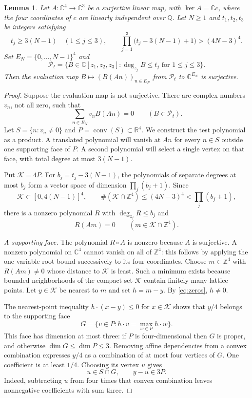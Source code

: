 \documentclass[11pt,a4paper]{amsart}
\newtheorem{lemma}[theorem]{Lemma}
\theoremstyle{remark}
\newcommand{\Q}{\mathbb Q}
\newcommand{\Z}{\mathbb Z}
\newcommand{\C}{\mathbb C}
\newcommand{\R}{\mathbb R}
\newcommand{\cP}{\mathcal P}
\newcommand{\cK}{\mathcal K}
\DeclareMathOperator{\conv}{conv}
\numberwithin{equation}{section}
\begin{document}
\begin{lemma}\label{lem:interpolation}
Let $A:\C^4\to\C^3$ be a surjective linear map, with $\ker A=\C c$, where the
four coordinates of $c$ are linearly independent over $\Q$.
Let $N\ge1$ and $t_1,t_2,t_3$ be integers satisfying
\begin{equation}\label{eq:budget}
 t_j\ge3(N-1)\quad(1\le j\le3),\qquad
 \prod_{j=1}^3\bigl(t_j-3(N-1)+1\bigr)>(4N-3)^4.
\end{equation}
Set $E_N=\{0,\ldots,N-1\}^4$ and
\[
 \cP_t=\{B\in\C[z_1,z_2,z_3]:\deg_{z_j}B\le t_j
                                      \text{ for }1\le j\le3\}.
\]
Then the evaluation map $B\mapsto(B(An))_{n\in E_N}$ from
$\cP_t$ to $\C^{E_N}$ is surjective.
\end{lemma}

\begin{proof}
Suppose the evaluation map is not surjective. There are complex
numbers $v_n$, not all zero, such that
\begin{equation}\label{eq:moments}
 \sum_{n\in E_N}v_nB(An)=0\qquad(B\in\cP_t).
\end{equation}
Let $S=\{n:v_n\ne0\}$ and $P=\conv(S)\subset\R^4$.
We construct the test polynomial as a product. A translated
polynomial will vanish at $An$ for every $n\in S$ outside one
supporting face of $P$. A second polynomial will select a single
vertex on that face, with total degree at most $3(N-1)$.

Put $\cK=4P$. For $b_j=t_j-3(N-1)$, the polynomials of separate degrees
at most $b_j$ form a vector space of dimension $\prod_j(b_j+1)$.
Since
\[
 \cK\subset[0,4(N-1)]^4,\qquad
 \#(\cK\cap\Z^4)\le(4N-3)^4<\prod_j(b_j+1),
\]
there is a nonzero polynomial $R$ with $\deg_{z_j}R\le b_j$ and
\begin{equation}\label{eq:zeros}
 R(Am)=0\qquad(m\in\cK\cap\Z^4).
\end{equation}

\smallskip\noindent
\emph{A supporting face.}
The polynomial $R\circ A$ is nonzero because $A$ is surjective.
A nonzero polynomial on $\C^4$ cannot vanish on all of $\Z^4$:
this follows by applying the one-variable root bound successively
to its four coordinates. Choose $m\in\Z^4$ with $R(Am)\ne0$ whose
distance to $\cK$ is least. Such a minimum exists because bounded
neighborhoods of the compact set $\cK$ contain finitely many lattice
points. Let $y\in\cK$ be nearest to $m$ and set $h=m-y$.
By \eqref{eq:zeros}, $h\ne0$.

The nearest-point inequality
$h\cdot(x-y)\le0$ for $x\in\cK$ shows that $y/4$ belongs to
the supporting face
\[
 G=\{v\in P:h\cdot v=\max_{w\in P}h\cdot w\}.
\]
This face has dimension at most three: if $P$ is four-dimensional
then $G$ is proper, and otherwise $\dim G\le\dim P\le3$.
Removing affine dependencies from a convex combination expresses
$y/4$ as a combination of at most four vertices of $G$. One
coefficient is at least $1/4$. Choosing its vertex $u$ gives
\begin{equation}\label{eq:vertex}
 u\in S\cap G,\qquad y-u\in3P.
\end{equation}
Indeed, subtracting $u$ from four times that convex combination
leaves nonnegative coefficients with sum three.


\end{proof}
\end{document}
